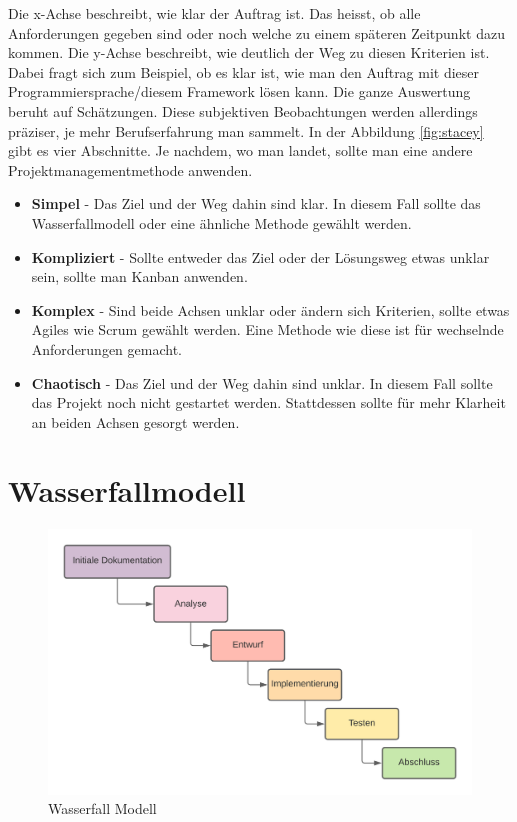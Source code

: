 Die x-Achse beschreibt, wie klar der Auftrag ist. Das heisst, ob alle Anforderungen gegeben sind oder noch welche zu einem späteren Zeitpunkt dazu kommen. Die y-Achse beschreibt, wie deutlich der Weg zu diesen Kriterien ist. Dabei fragt sich zum Beispiel, ob es klar ist, wie man den Auftrag mit dieser Programmiersprache/diesem Framework lösen kann.
\newline
Die ganze Auswertung beruht auf Schätzungen. Diese subjektiven Beobachtungen werden allerdings präziser, je mehr Berufserfahrung man sammelt.
\newline
In der Abbildung \ref*{fig:stacey} gibt es vier Abschnitte. Je nachdem, wo man landet, sollte man eine andere Projektmanagementmethode anwenden.
\newpage
\begin{itemize}
  \item \textbf{Simpel} - Das Ziel und der Weg dahin sind klar. In diesem Fall sollte das Wasserfallmodell oder eine ähnliche Methode gewählt werden.
  \item \textbf{Kompliziert} - Sollte entweder das Ziel oder der Lösungsweg etwas unklar sein, sollte man Kanban anwenden.
  \item \textbf{Komplex} - Sind beide Achsen unklar oder ändern sich Kriterien, sollte etwas Agiles wie Scrum gewählt werden. Eine Methode wie diese ist für wechselnde Anforderungen gemacht.
  \item \textbf{Chaotisch} - Das Ziel und der Weg dahin sind unklar. In diesem Fall sollte das Projekt noch nicht gestartet werden. Stattdessen sollte für mehr Klarheit an beiden Achsen gesorgt werden. 
\end{itemize}

\section{Wasserfallmodell}

\begin{figure}[!ht]
  \centering
  \includegraphics[width=.95\linewidth]{./images/OSEDashboard_Wasserfall.png}
  \caption[Ein von mir mit Lucidchart erstelltes Wasserfallmodell]{Wasserfall Modell}
  \label{fig:wasserfall}
\end{figure}

